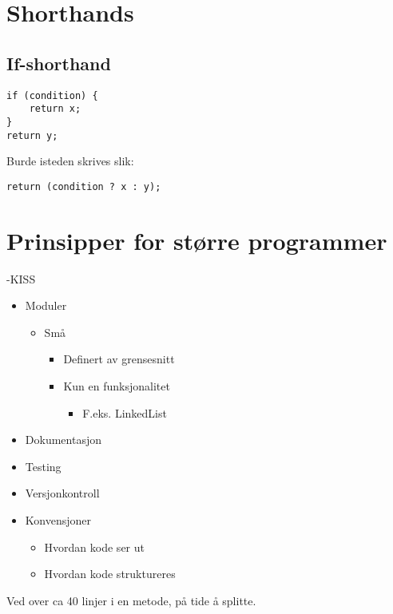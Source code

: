\documentclass[11pt]{article}
\begin{document}
\section{Shorthands}
\label{sec-20}
\subsection{If-shorthand}
\label{sec-20_1}


\begin{verbatim}
if (condition) {
    return x;
}
return y;
\end{verbatim}

Burde isteden skrives slik:

\begin{verbatim}
return (condition ? x : y);
\end{verbatim}
\section{Prinsipper for større programmer}
\label{sec-21}

-KISS
\begin{itemize}
\item Moduler

\begin{itemize}
\item Små

\begin{itemize}
\item Definert av grensesnitt
\item Kun en funksjonalitet

\begin{itemize}
\item F.eks. LinkedList
\end{itemize}

\end{itemize}

\end{itemize}

\item Dokumentasjon
\item Testing
\item Versjonkontroll
\item Konvensjoner

\begin{itemize}
\item Hvordan kode ser ut
\item Hvordan kode struktureres
\end{itemize}

\end{itemize}


Ved over ca 40 linjer i en metode, på tide å splitte.
\end{document}
